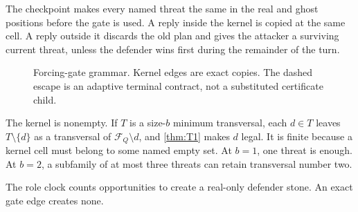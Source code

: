 \begin{plainterms}
The checkpoint makes every named threat the same in the real and ghost
positions before the gate is used.  A reply inside the kernel is copied at
the same cell.  A reply outside it discards the old plan and gives the
attacker a surviving current threat, unless the defender wins first during
the remainder of the turn.
\end{plainterms}

\begin{figure}[tbp]
  \centering
  \caption{Forcing-gate grammar.  Kernel edges are exact copies.  The dashed
  escape is an adaptive terminal contract, not a substituted certificate
  child.}
  \label{fig:forcing-gate}
\end{figure}

The kernel is nonempty.  If $T$ is a size-$b$ minimum transversal, each
$d\in T$ leaves $T\setminus\{d\}$ as a transversal of
$\mathcal F_Q\setminus d$, and \cref{thm:T1} makes $d$ legal.  It is finite
because a kernel cell must belong to some named empty set.  At $b=1$, one
threat is enough.  At $b=2$, a subfamily of at most three threats can retain
transversal number two.

The role clock counts opportunities to create a real-only defender stone.
An exact gate edge creates none.

